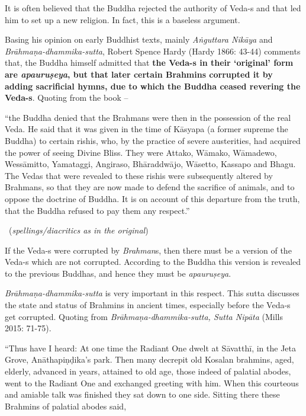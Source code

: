 It is often believed that the Buddha rejected the authority of Veda-s and that led him to set up a new religion. In fact, this is a baseless argument.

Basing his opinion on early Buddhist texts, mainly \textit{Aṅguttara Nikāya} and \textit{Brāhmaṇa-dhammika-sutta}, Robert Spence Hardy (Hardy 1866: 43-44) comments that, the Buddha himself admitted that \textbf{the Veda-s in their ‘original’ form are \textit{apauruṣeya}, but that later certain Brahmins corrupted it by adding sacrificial hymns, due to which the Buddha ceased revering the Veda-s}. Quoting from the book –

\begin{myquote}
“the Buddha denied that the Brahmans were then in the possession of the real Veda. He said that it was given in the time of Kāsyapa (a former supreme the Buddha) to certain rishis, who, by the practice of severe austerities, had acquired the power of seeing Divine Bliss. They were Attako, Wāmako, Wāmadewo, Wessāmitto, Yamataggi, Angiraso, Bhāraddwājo, Wāsetto, Kassapo and Bhagu. The Vedas that were revealed to these rishis were subsequently altered by Brahmans, so that they are now made to defend the sacrifice of animals, and to oppose the doctrine of Buddha. It is on account of this departure from the truth, that the Buddha refused to pay them any respect.” 

~\hfill (\textit{spellings/diacritics as in the original})
\end{myquote}

If the Veda-s were corrupted by \textit{Brahman}s, then there must be a version of the Veda-s which are not corrupted. According to the Buddha this version is revealed to the previous Buddhas, and hence they must be \textit{apauruṣeya}.

\textit{Brāhmaṇa-dhammika-sutta} is very important in this respect. This sutta discusses the state and status of Brahmins in ancient times, especially before the Veda-s get corrupted. Quoting from \textit{Brāhmaṇa-dhammika-sutta, Sutta Nipāta} (Mills 2015: 71-75).

“Thus have I heard: At one time the Radiant One dwelt at Sāvatthī, in the Jeta Grove, Anāthapiṇḍika’s park. Then many decrepit old Kosalan brahmins, aged, elderly, advanced in years, attained to old age, those indeed of palatial abodes, went to the Radiant One and exchanged greeting with him. When this courteous and amiable talk was finished they sat down to one side. Sitting there these Brahmins of palatial abodes said,

